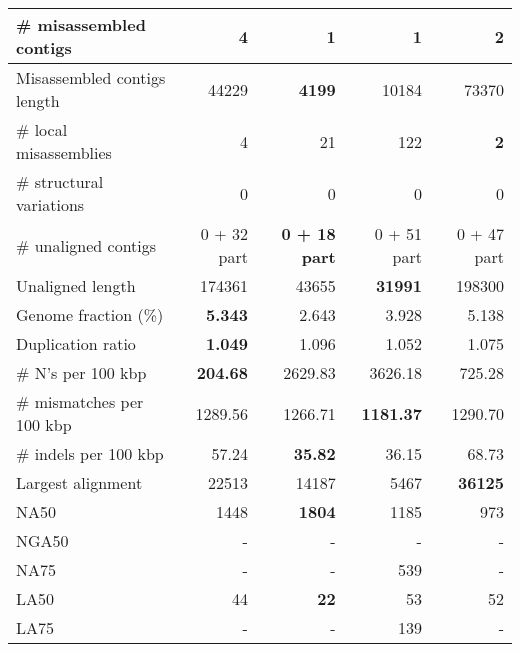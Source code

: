 \documentclass[12pt,a4paper]{article}
\begin{document}
\begin{table}[ht]
\begin{center}
\begin{tabular}{|l*{4}{|r}|}
\# misassembled contigs & 4 & {\bf 1} & {\bf 1} & 2 \\ \hline
Misassembled contigs length & 44229 & {\bf 4199} & 10184 & 73370 \\ \hline
\# local misassemblies & 4 & 21 & 122 & {\bf 2} \\ \hline
\# structural variations & 0 & 0 & 0 & 0 \\ \hline
\# unaligned contigs & 0 + 32 part & {\bf 0 + 18 part} & 0 + 51 part & 0 + 47 part \\ \hline
Unaligned length & 174361 & 43655 & {\bf 31991} & 198300 \\ \hline
Genome fraction (\%) & {\bf 5.343} & 2.643 & 3.928 & 5.138 \\ \hline
Duplication ratio & {\bf 1.049} & 1.096 & 1.052 & 1.075 \\ \hline
\# N's per 100 kbp & {\bf 204.68} & 2629.83 & 3626.18 & 725.28 \\ \hline
\# mismatches per 100 kbp & 1289.56 & 1266.71 & {\bf 1181.37} & 1290.70 \\ \hline
\# indels per 100 kbp & 57.24 & {\bf 35.82} & 36.15 & 68.73 \\ \hline
Largest alignment & 22513 & 14187 & 5467 & {\bf 36125} \\ \hline
NA50 & 1448 & {\bf 1804} & 1185 & 973 \\ \hline
NGA50 & - & - & - & - \\ \hline
NA75 & - & - & 539 & - \\ \hline
LA50 & 44 & {\bf 22} & 53 & 52 \\ \hline
LA75 & - & - & 139 & - \\ \hline
\end{tabular}
\end{center}
\end{table}
\end{document}
